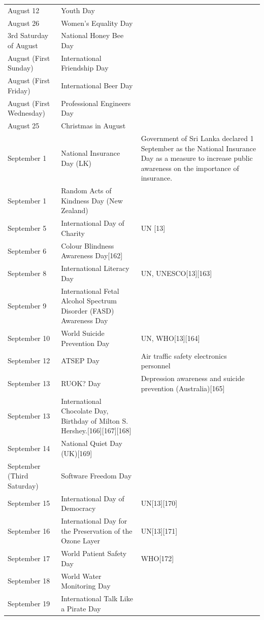 \documentclass[
]{book}
\begin{document}
\begin{longtable}[t]{>{\raggedright\arraybackslash}p{8em}>{\raggedright\arraybackslash}p{20em}>{\raggedright\arraybackslash}p{12em}}
\addlinespace
August 12 & Youth Day & \\
August 26 & Women's Equality Day & \\
3rd Saturday of August & National Honey Bee Day & \\
August (First Sunday) & International Friendship Day & \\
August (First Friday) & International Beer Day & \\
\addlinespace
August (First Wednesday) & Professional Engineers Day & \\
August 25 & Christmas in August & \\
September 1 & National Insurance Day (LK) & Government of Sri Lanka declared 1 September as the National Insurance Day as a measure to increase public awareness on the importance of insurance.\\
September 1 & Random Acts of Kindness Day (New Zealand) & \\
September 5 & International Day of Charity & UN [13]\\
\addlinespace
September 6 & Colour Blindness Awareness Day[162] & \\
September 8 & International Literacy Day & UN, UNESCO[13][163]\\
September 9 & International Fetal Alcohol Spectrum Disorder (FASD) Awareness Day & \\
September 10 & World Suicide Prevention Day & UN, WHO[13][164]\\
September 12 & ATSEP Day & Air traffic safety electronics personnel\\
\addlinespace
September 13 & RUOK? Day & Depression awareness and suicide prevention (Australia)[165]\\
September 13 & International Chocolate Day, Birthday of Milton S. Hershey.[166][167][168] & \\
September 14 & National Quiet Day (UK)[169] & \\
September (Third Saturday) & Software Freedom Day & \\
September 15 & International Day of Democracy & UN[13][170]\\
\addlinespace
September 16 & International Day for the Preservation of the Ozone Layer & UN[13][171]\\
September 17 & World Patient Safety Day & WHO[172]\\
September 18 & World Water Monitoring Day & \\
September 19 & International Talk Like a Pirate Day & \\

\end{longtable}
\end{document}
